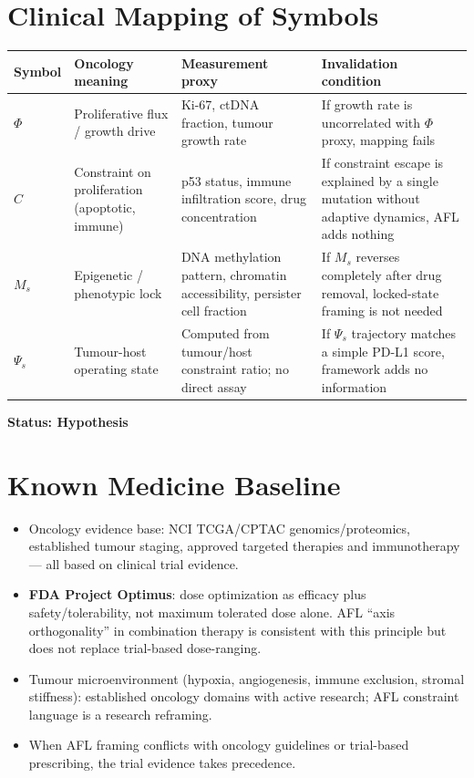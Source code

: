 \documentclass[12pt,a4paper]{article}
\begin{document}
\section{Clinical Mapping of Symbols}

\begin{center}
\begin{tabular}{p{1.5cm}p{3.0cm}p{3.5cm}p{4.5cm}}
\toprule
Symbol & Oncology meaning & Measurement proxy & Invalidation condition \\
\midrule
$\Phi$ & Proliferative flux / growth drive & Ki-67, ctDNA fraction, tumour growth rate & If growth rate is uncorrelated with $\Phi$ proxy, mapping fails \\
$C$ & Constraint on proliferation (apoptotic, immune) & p53 status, immune infiltration score, drug concentration & If constraint escape is explained by a single mutation without adaptive dynamics, AFL adds nothing \\
$M_s$ & Epigenetic / phenotypic lock & DNA methylation pattern, chromatin accessibility, persister cell fraction & If $M_s$ reverses completely after drug removal, locked-state framing is not needed \\
$\Psi_s$ & Tumour-host operating state & Computed from tumour/host constraint ratio; no direct assay & If $\Psi_s$ trajectory matches a simple PD-L1 score, framework adds no information \\
\bottomrule
\end{tabular}
\end{center}

\textbf{Status: Hypothesis}

\section{Known Medicine Baseline}

\begin{itemize}
    \item Oncology evidence base: NCI TCGA/CPTAC genomics/proteomics, established tumour staging, approved targeted therapies and immunotherapy — all based on clinical trial evidence.
    \item \textbf{FDA Project Optimus}: dose optimization as efficacy plus safety/tolerability, not maximum tolerated dose alone. AFL ``axis orthogonality'' in combination therapy is consistent with this principle but does not replace trial-based dose-ranging.
    \item Tumour microenvironment (hypoxia, angiogenesis, immune exclusion, stromal stiffness): established oncology domains with active research; AFL constraint language is a research reframing.
    \item When AFL framing conflicts with oncology guidelines or trial-based prescribing, the trial evidence takes precedence.
\end{itemize}
\end{document}
